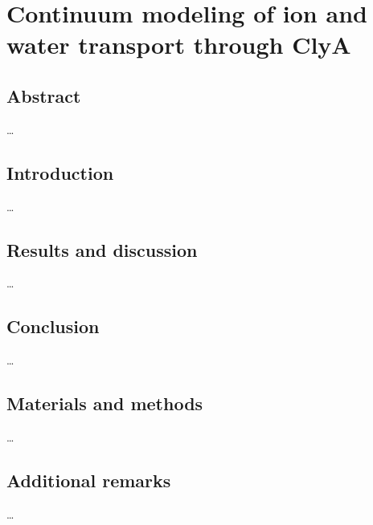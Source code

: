 \chapter{Continuum modeling of ion and water transport through ClyA}\label{ch:epnpns}

\section{Abstract}
\ldots
\section{Introduction}
\ldots
\section{Results and discussion}
\ldots
\section{Conclusion}
\ldots
\section{Materials and methods}
\ldots
\section{Additional remarks}
\ldots


\cleardoublepage


